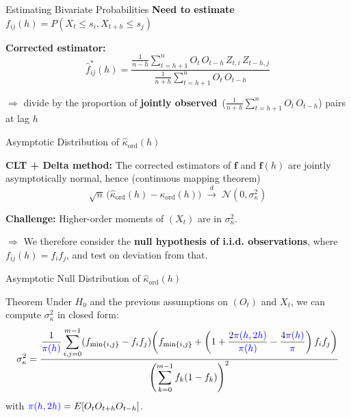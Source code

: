 \documentclass{beamer}
\begin{document}
\begin{frame}{Estimating Bivariate Probabilities}
\textbf{Need to estimate $f_{ij}(h) = P(X_t \leq s_i, X_{t+h} \leq s_j)$}

\vspace{0.3cm}

\textbf{Corrected estimator:}
\[
\hat{f}^*_{ij}(h) =  \frac{\frac{1}{n-h}\sum_{t=h+1}^{n} O_t\, O_{t-h}\, Z_{t,i}\, Z_{t-h,j}}{\frac{1}{n+h} \sum_{t=h+1}^{n} O_t\, O_{t-h}}
\]

$\Rightarrow$ divide by the proportion of \textbf{jointly observed}~($\frac{1}{n+h} \sum_{t=h+1}^{n} O_t\, O_{t-h}$) pairs at lag $h$
\end{frame}

\begin{frame}{Asymptotic Distribution of $\hat{\kappa}_{\mathrm{ord}}(h)$}

\vspace{0.3cm}
\textbf{CLT + Delta method:}
The corrected estimators of $\boldsymbol{f}$ and $\boldsymbol{f}(h)$ are jointly asymptotically normal, hence (continuous mapping theorem)
\[
\sqrt{n}\,\bigl(\hat{\kappa}_{\mathrm{ord}}(h) - \kappa_{\mathrm{ord}}(h)\bigr)
\;\xrightarrow{d}\;
\mathcal{N}(0, \sigma_\kappa^2)
\]
\vspace{0.3cm}

\textbf{Challenge:}
Higher-order moments of $(X_t)$ are in $\sigma_\kappa^2$.

\vspace{0.3cm}

$\Rightarrow$ We therefore consider the \textbf{null hypothesis of i.i.d. observations}, where $f_{ij}(h) = f_i f_j$, and test on deviation from that.



\vspace{0.3cm}

\end{frame}
\begin{frame}{Asymptotic Null Distribution of $\hat{\kappa}_{\mathrm{ord}}(h)$}

\vspace{0.3cm}

\begin{block}{Theorem}
Under $H_0$ and the previous assumptions on $(O_t)$ and $X_t$, we can compute $\sigma_\kappa^2$ in closed form:
\[
\sigma^2_\kappa =
\frac{\dfrac{1}{\textcolor{blue}{\pi(h)}}\displaystyle\sum_{i,j=0}^{m-1}
(f_{\min\{i,j\}}-f_i f_j)
\!\left(f_{\min\{i,j\}} + \left(1+\dfrac{2\textcolor{blue}{\pi(h,2h)}}{\textcolor{blue}{\pi(h)}} - \dfrac{4\textcolor{blue}{\pi(h)}}{\textcolor{blue}{\pi}}\right)f_if_j\right)}
{\left(\displaystyle\sum_{k=0}^{m-1}f_k(1-f_k)\right)^2}
\]
with $\textcolor{blue}{\pi(h,2h)} = E[O_t O_{t+h} O_{t-h}]$.
\end{block}
\end{frame}
\end{document}
